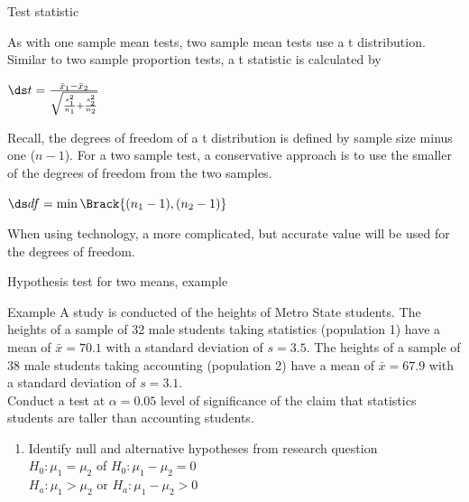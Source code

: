 \documentclass[xcolor=table]{beamer}
\begin{document}
\begin{frame}{Test statistic}
\begin{block}{}
\large
As with one sample mean tests, two sample mean tests use a t distribution. Similar to two sample proportion tests, a t statistic  is calculated by\\
\medskip
{\centering $\ds t = \frac {\bar x_1 - \bar x_2}{\sqrt{\frac{s_1^2}{n_1} + \frac{s_2^2}{n_2}}}$ \par}
\medskip\pause
Recall, the degrees of freedom of a t distribution is defined by sample size minus one ($n-1$). For a two sample test, a conservative approach is to use the smaller of the degrees of freedom from the two samples.\\
\medskip
{\centering $\ds df = \min\Brack{(n_1-1) , (n_2-1)}$ \par}
\pause\medskip
When using technology, a more complicated, but accurate value will be used for the degrees of freedom.
\end{block}
\end{frame}

\begin{frame}{Hypothesis test for two means, example}
\begin{exampleblock}{Example}
\large
A study is conducted of the heights of Metro State students. The heights of a sample of 32 male students taking statistics (population 1) have a mean of $\bar x = 70.1$ with a standard deviation of $s=3.5$. The heights of a sample of 38 male students taking accounting (population 2) have a mean of $\bar x = 67.9$ with a standard deviation of $s=3.1$.\\
\medskip
Conduct a test at $\alpha=0.05$ level of significance of the claim that statistics students are taller than accounting students.
\begin{enumerate}
\pause\item Identify null and alternative hypotheses from research question\\
\pause$H_0: \mu_1 = \mu_2$ of $H_0: \mu_1 - \mu_2 = 0$\\
$H_a: \mu_1 > \mu_2$ or $H_a: \mu_1 - \mu_2 > 0$\\
\end{enumerate}
\end{exampleblock}
\end{frame}
\end{document}
